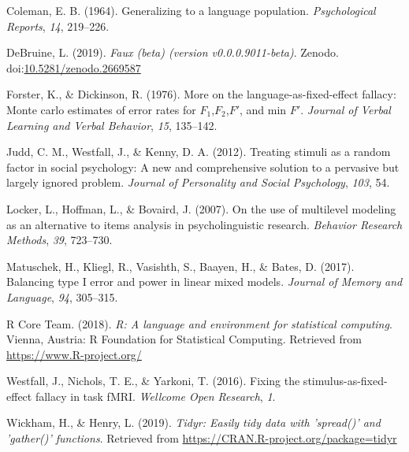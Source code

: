 \documentclass[man,floatsintext]{apa6}
\begin{document}
\leavevmode\hypertarget{ref-coleman_1964}{}%
Coleman, E. B. (1964). Generalizing to a language population. \emph{Psychological Reports}, \emph{14}, 219--226.

\leavevmode\hypertarget{ref-R-faux}{}%
DeBruine, L. (2019). \emph{Faux (beta) (version v0.0.0.9011-beta)}. Zenodo. doi:\href{https://doi.org/10.5281/zenodo.2669587}{10.5281/zenodo.2669587}

\leavevmode\hypertarget{ref-forster_dickinson_1976}{}%
Forster, K., \& Dickinson, R. (1976). More on the language-as-fixed-effect fallacy: Monte carlo estimates of error rates for \(F_1\),\(F_2\),\(F'\), and min \(F'\). \emph{Journal of Verbal Learning and Verbal Behavior}, \emph{15}, 135--142.

\leavevmode\hypertarget{ref-judd_westfall_kenny_2012}{}%
Judd, C. M., Westfall, J., \& Kenny, D. A. (2012). Treating stimuli as a random factor in social psychology: A new and comprehensive solution to a pervasive but largely ignored problem. \emph{Journal of Personality and Social Psychology}, \emph{103}, 54.

\leavevmode\hypertarget{ref-locker_hoffman_bovaird_2007}{}%
Locker, L., Hoffman, L., \& Bovaird, J. (2007). On the use of multilevel modeling as an alternative to items analysis in psycholinguistic research. \emph{Behavior Research Methods}, \emph{39}, 723--730.

\leavevmode\hypertarget{ref-matuschek_et_al_2017}{}%
Matuschek, H., Kliegl, R., Vasishth, S., Baayen, H., \& Bates, D. (2017). Balancing type I error and power in linear mixed models. \emph{Journal of Memory and Language}, \emph{94}, 305--315.

\leavevmode\hypertarget{ref-R-base}{}%
R Core Team. (2018). \emph{R: A language and environment for statistical computing}. Vienna, Austria: R Foundation for Statistical Computing. Retrieved from \url{https://www.R-project.org/}

\leavevmode\hypertarget{ref-westfall_yarkoni_2016}{}%
Westfall, J., Nichols, T. E., \& Yarkoni, T. (2016). Fixing the stimulus-as-fixed-effect fallacy in task fMRI. \emph{Wellcome Open Research}, \emph{1}.

\leavevmode\hypertarget{ref-R-tidyr}{}%
Wickham, H., \& Henry, L. (2019). \emph{Tidyr: Easily tidy data with 'spread()' and 'gather()' functions}. Retrieved from \url{https://CRAN.R-project.org/package=tidyr}

\endgroup

\clearpage
\makeatletter
\efloat@restorefloats
\makeatother
\end{document}
